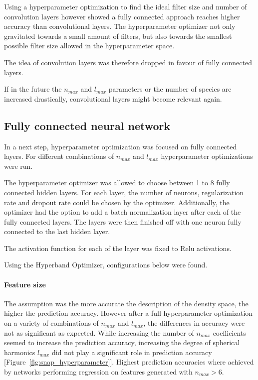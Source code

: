 Using a hyperparameter optimization to find the ideal filter size and number of convolution layers however showed
a fully connected approach reaches higher accuracy than convolutional layers.
The hyperparameter optimizer not only gravitated towards a small amount of filters, but also towards 
the smallest possible filter size allowed in the hyperparameter space.

The idea of convolution layers was therefore dropped in favour of fully connected layers.

If in the future the $n_{max}$ and $l_{max}$ parameters or the number of species are increased drastically, 
convolutional layers might become relevant again.

\subsection{Fully connected neural network}

In a next step, hyperparameter optimization was focused on fully connected layers.
For different combinations of $n_{max}$ and $l_{max}$ hyperparameter optimizations were run.

The hyperparameter optimizer was allowed to choose between 1 to 8 fully connected hidden layers.
For each layer, the number of neurons, regularization rate and dropout rate could be chosen by the optimizer.
Additionally, the optimizer had the option to add a batch normalization layer after each of the fully connected layers.
The layers were then finished off with one neuron fully connected to the last hidden layer.

The activation function for each of the layer was fixed to Relu activations.

Using the Hyperband Optimizer, configurations below were found.

\paragraph{Feature size}
The assumption was the more accurate the description of the density space, the higher the prediction accuracy.
However after a full hyperparameter optimization on a variety of combinations of $n_{max}$ and $l_{max}$,
the differences in accuracy were not as significant as expected.
While increasing the number of $n_{max}$ coefficients seemed to increase the prediction accuracy,
increasing the degree of spherical harmonics $l_{max}$ did not play a significant role in prediction accuracy [Figure~\ref{fig:snap_hyperparameter}].
Highest prediction accuracies where achieved by networks performing regression on features generated with $n_{max} > 6$.

